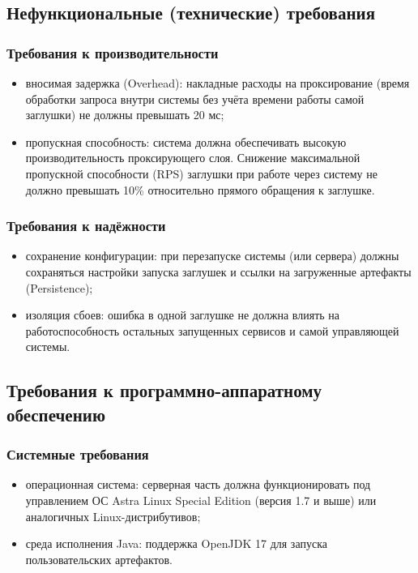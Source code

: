 \subsection{Нефункциональные (технические) требования}

\subsubsection {Требования к производительности}

\begin{itemize}
\item вносимая задержка (Overhead): накладные расходы на проксирование (время обработки запроса внутри системы без учёта времени работы самой заглушки) не должны превышать 20 мс;
\item пропускная способность: система должна обеспечивать высокую производительность проксирующего слоя. Снижение максимальной пропускной способности (RPS) заглушки при работе через систему не должно превышать 10\% относительно прямого обращения к заглушке.
\end{itemize}

\subsubsection {Требования к надёжности}

\begin{itemize}
\item сохранение конфигурации: при перезапуске системы (или сервера) должны сохраняться настройки запуска заглушек и ссылки на загруженные артефакты (Persistence);
\item изоляция сбоев: ошибка в одной заглушке не должна влиять на работоспособность остальных запущенных сервисов и самой управляющей системы.
\end{itemize}

\subsection{Требования к программно-аппаратному обеспечению}

\subsubsection {Системные требования}

\begin{itemize}
\item операционная система: серверная часть должна функционировать под управлением ОС Astra Linux Special Edition (версия 1.7 и выше) или аналогичных Linux-дистрибутивов;
\item среда исполнения Java: поддержка OpenJDK 17 для запуска пользовательских артефактов.
\end{itemize}

